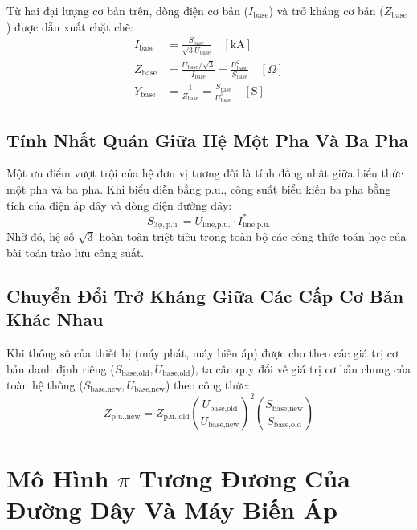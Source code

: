 \documentclass[12pt,a4paper,oneside]{report}
\begin{document}
Từ hai đại lượng cơ bản trên, dòng điện cơ bản ($I_{\text{base}}$) và trở kháng cơ bản ($Z_{\text{base}}$) được dẫn xuất chặt chẽ:
\begin{align}
I_{\text{base}} &= \frac{S_{\text{base}}}{\sqrt{3} U_{\text{base}}} \quad [\text{kA}] \\
Z_{\text{base}} &= \frac{U_{\text{base}} / \sqrt{3}}{I_{\text{base}}} = \frac{U_{\text{base}}^2}{S_{\text{base}}} \quad [\Omega] \\
Y_{\text{base}} &= \frac{1}{Z_{\text{base}}} = \frac{S_{\text{base}}}{U_{\text{base}}^2} \quad [\text{S}]
\end{align}

\subsection{Tính Nhất Quán Giữa Hệ Một Pha Và Ba Pha}
Một ưu điểm vượt trội của hệ đơn vị tương đối là tính đồng nhất giữa biểu thức một pha và ba pha. Khi biểu diễn bằng p.u., công suất biểu kiến ba pha bằng tích của điện áp dây và dòng điện đường dây:
\begin{equation}
S_{\text{3}\phi,\text{p.u.}} = U_{\text{line,p.u.}} \cdot I_{\text{line,p.u.}}^*
\end{equation}
Nhờ đó, hệ số $\sqrt{3}$ hoàn toàn triệt tiêu trong toàn bộ các công thức toán học của bài toán trào lưu công suất.

\subsection{Chuyển Đổi Trở Kháng Giữa Các Cấp Cơ Bản Khác Nhau}
Khi thông số của thiết bị (máy phát, máy biến áp) được cho theo các giá trị cơ bản danh định riêng ($S_{\text{base,old}}, U_{\text{base,old}}$), ta cần quy đổi về giá trị cơ bản chung của toàn hệ thống ($S_{\text{base,new}}, U_{\text{base,new}}$) theo công thức:
\begin{equation}
Z_{\text{p.u.,new}} = Z_{\text{p.u.,old}} \left( \frac{U_{\text{base,old}}}{U_{\text{base,new}}} \right)^2 \left( \frac{S_{\text{base,new}}}{S_{\text{base,old}}} \right)
\end{equation}

\section{Mô Hình $\pi$ Tương Đương Của Đường Dây Và Máy Biến Áp}
\end{document}
